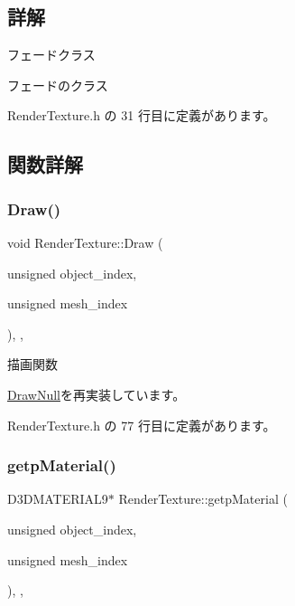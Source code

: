 \subsection{詳解}
フェードクラス 

フェードのクラス 

 Render\+Texture.\+h の 31 行目に定義があります。



\subsection{関数詳解}
\mbox{\label{class_render_texture_a529ab829c676470ae5764b42cba9efb0}} 
\subsubsection{\texorpdfstring{Draw()}{Draw()}}
{\footnotesize\ttfamily void Render\+Texture\+::\+Draw (\begin{DoxyParamCaption}\item[{unsigned}]{object\+\_\+index,  }\item[{unsigned}]{mesh\+\_\+index }\end{DoxyParamCaption})\hspace{0.3cm}{\ttfamily [inline]}, {\ttfamily [override]}, {\ttfamily [virtual]}}



描画関数 



\mbox{\hyperlink{class_draw_null_afe50f6fd820b18d673f70f048743f339}{Draw\+Null}}を再実装しています。



 Render\+Texture.\+h の 77 行目に定義があります。

\mbox{\label{class_render_texture_a1defe8bfacccf91dc7479a977e70578c}} 
\subsubsection{\texorpdfstring{getp\+Material()}{getpMaterial()}}
{\footnotesize\ttfamily D3\+D\+M\+A\+T\+E\+R\+I\+A\+L9$\ast$ Render\+Texture\+::getp\+Material (\begin{DoxyParamCaption}\item[{unsigned}]{object\+\_\+index,  }\item[{unsigned}]{mesh\+\_\+index }\end{DoxyParamCaption})\hspace{0.3cm}{\ttfamily [inline]}, {\ttfamily [override]}, {\ttfamily [virtual]}}



